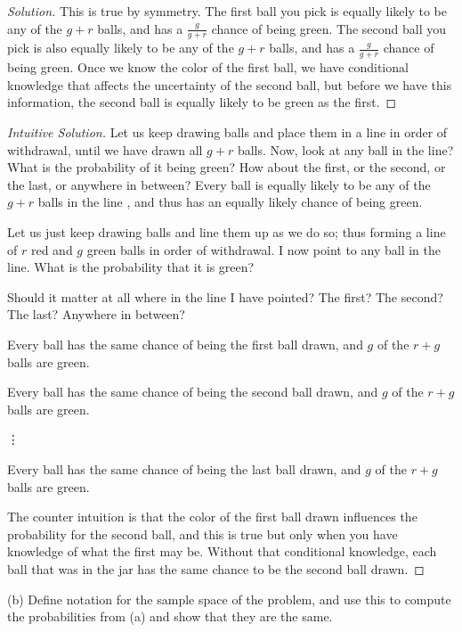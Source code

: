 \documentclass[10pt]{article}
\begin{document}
\begin{proof}[Solution]

This is true by symmetry. The first ball you pick is equally likely to be any of the $g + r$ balls, and has a \(\frac{g}{g + r}\) chance of being green. The second ball you pick is also equally likely to be any of the $g + r$ balls, and has a \(\frac{g}{g + r}\) chance of being green. Once we know the color of the first ball, we have conditional knowledge that affects the uncertainty of the second ball, but before we have this information, the second ball is equally likely to be green as the first.

\end{proof}
\begin{proof} [Intuitive Solution]
Let us keep drawing balls and place them in a line in order of withdrawal, until we have drawn all $g + r$ balls. Now, look at any ball in the line? What is the probability of it being green? How about the first, or the second, or the last, or anywhere in between? Every ball is equally likely to be any of the $g + r$ balls in the line , and thus has an equally likely chance of being green. 

Let us just keep drawing balls and line them up as we do so; thus forming a line of $r$ red and $g$ green balls in order of withdrawal. I now point to any ball in the line. What is the probability that it is green?

Should it matter at all where in the line I have pointed? The first? The second? The last? Anywhere in between?

Every ball has the same chance of being the first ball drawn, and $g$ of the $r+g$ balls are green.

Every ball has the same chance of being the second ball drawn, and $g$ of the $r+g$ balls are green.

\vdots

Every ball has the same chance of being the last ball drawn, and $g$ of the $r+g$ balls are green.

The counter intuition is that the color of the first ball drawn influences the probability for the second ball, and this is true but only when you have knowledge of what the first may be. Without that conditional knowledge, each ball that was in the jar has the same chance to be the second ball drawn.
\end{proof}

(b) Define notation for the sample space of the problem, and use this to compute the probabilities from (a) and show that they are the same.
\end{document}
